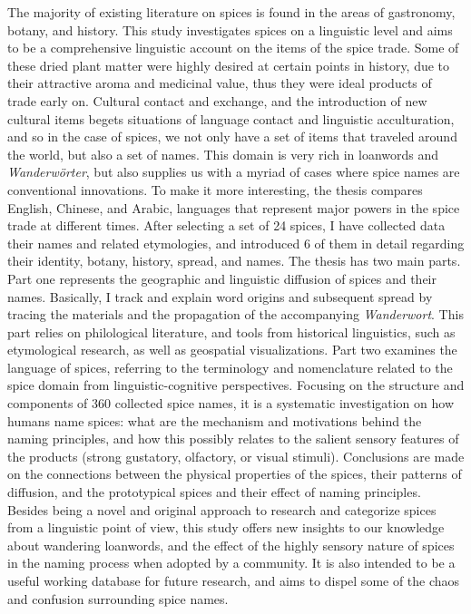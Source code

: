 The majority of existing literature on spices is found in the areas of gastronomy, botany, and history. This study investigates spices on a linguistic level and aims to be a comprehensive linguistic account on the items of the spice trade. Some of these dried plant matter were highly desired at certain points in history, due to their attractive aroma and medicinal value, thus they were ideal products of trade early on. Cultural contact and exchange, and the introduction of new cultural items begets situations of language contact and linguistic acculturation, and so in the case of spices, we not only have a set of items that traveled around the world, but also a set of names. This domain is very rich in loanwords and \textit{Wanderwörter}, but also supplies us with a myriad of cases where spice names are conventional innovations. To make it more interesting, the thesis compares English, Chinese, and Arabic, languages that represent major powers in the spice trade at different times. After selecting a set of 24 spices, I have collected data their names and related etymologies, and introduced 6 of them in detail regarding their identity, botany, history, spread, and names. The thesis has two main parts. Part one represents the geographic and linguistic diffusion of spices and their names. Basically, I track and explain word origins and subsequent spread by tracing the materials and the propagation of the accompanying \textit{Wanderwort}. This part relies on philological literature, and tools from historical linguistics, such as etymological research, as well as geospatial visualizations. Part two examines the language of spices, referring to the terminology and nomenclature related to the spice domain from linguistic-cognitive perspectives. Focusing on the structure and components of 360 collected spice names, it is a systematic investigation on how humans name spices: what are the mechanism and motivations behind the naming principles, and how this possibly relates to the salient sensory features of the products (strong gustatory, olfactory, or visual stimuli). Conclusions are made on the connections between the physical properties of the spices, their patterns of diffusion, and the prototypical spices and their effect of naming principles. Besides being a novel and original approach to research and categorize spices from a linguistic point of view, this study offers new insights to our knowledge about wandering loanwords, and the effect of the highly sensory nature of spices in the naming process when adopted by a community. It is also intended to be a useful working database for future research, and aims to dispel some of the chaos and confusion surrounding spice names.

\relax
{}\relax